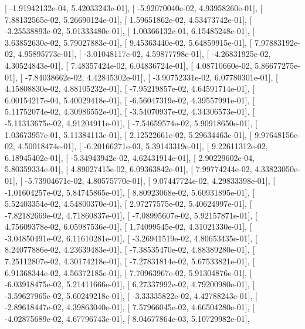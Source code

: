 \documentclass{article}
\begin{document}
       [ -1.91942132e-04,   5.42033243e-01],
       [ -5.92070040e-02,   4.93958260e-01],
       [  7.88132565e-02,   5.26690124e-01],
       [  1.59651862e-02,   4.53473742e-01],
       [ -3.25538893e-02,   5.01333480e-01],
       [  1.00366132e-01,   6.15485248e-01],
       [  3.63852630e-02,   5.79027883e-01],
       [  9.45363440e-02,   5.64859915e-01],
       [  7.97883192e-02,   4.95895773e-01],
       [ -3.01048117e-02,   4.59877798e-01],
       [ -4.26831925e-02,   4.30524843e-01],
       [  7.48357424e-02,   6.04836724e-01],
       [  4.08710660e-02,   5.86677275e-01],
       [ -7.84038662e-02,   4.42845302e-01],
       [ -3.90752331e-02,   6.07780301e-01],
       [  4.15808830e-02,   4.88105232e-01],
       [ -7.95219857e-02,   4.64591714e-01],
       [  6.00154217e-04,   5.40029418e-01],
       [ -6.56047319e-02,   4.39557991e-01],
       [  5.11752074e-02,   4.30986552e-01],
       [ -3.54070937e-02,   4.34306573e-01],
       [ -5.11313675e-02,   4.91204911e-01],
       [ -7.54659574e-02,   5.90918650e-01],
       [  1.03673957e-01,   5.11384113e-01],
       [  2.12522661e-02,   5.29634463e-01],
       [  9.97648156e-02,   4.50018474e-01],
       [ -6.20166271e-03,   5.39143319e-01],
       [  9.22611312e-02,   6.18945402e-01],
       [ -5.34943942e-02,   4.62431914e-01],
       [  2.90229602e-04,   5.80359334e-01],
       [  4.89027415e-02,   6.09363842e-01],
       [  7.99774244e-02,   4.33823050e-01],
       [ -5.73904671e-02,   4.80575770e-01],
       [  9.07447724e-02,   4.29833398e-01],
       [ -1.01604257e-02,   5.84745865e-01],
       [  8.80923068e-02,   5.60931895e-01],
       [  5.52403354e-02,   4.54800370e-01],
       [  2.97277575e-02,   5.40624997e-01],
       [ -7.82182669e-02,   4.71860837e-01],
       [ -7.08995607e-02,   5.92157871e-01],
       [  4.75609378e-02,   6.05987536e-01],
       [  1.74099545e-02,   4.31021330e-01],
       [ -3.04850491e-02,   6.11610281e-01],
       [ -3.26941519e-02,   4.80653435e-01],
       [  8.24077886e-02,   4.23639483e-01],
       [ -7.38535470e-02,   4.88389280e-01],
       [  7.25112807e-02,   4.30174218e-01],
       [ -7.27831814e-02,   5.67533821e-01],
       [  6.91368344e-02,   4.56372185e-01],
       [  7.70963967e-02,   5.91304876e-01],
       [ -6.03918475e-02,   5.21411666e-01],
       [  6.27337992e-02,   4.79200980e-01],
       [ -3.59627965e-02,   5.60249218e-01],
       [ -3.33335822e-02,   4.42788243e-01],
       [ -2.89618447e-02,   4.39863040e-01],
       [  7.57966045e-02,   4.66504280e-01],
       [ -4.02875689e-02,   4.67796743e-01],
       [  8.04677864e-03,   5.10729982e-01],
\end{document}
